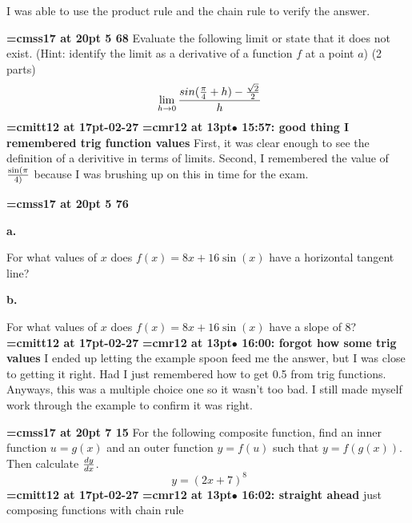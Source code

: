 I was able to use the product rule and the chain rule to verify the answer.
\par

{\medskip\noindent\bf\font\titlefont=cmss17 at 20pt 5 68}\medskip
Evaluate the following limit or state that it does not exist.
(Hint: identify the limit as a derivative of a function $f$
at a point $a$) (2 parts)
$$\
\lim_{h \to 0} {
{sin({\pi \over 4} + h}) - {\sqrt{2} \over 2}
\over
h
}
$$
{\medskip\noindent\bf\font\titlefont=cmitt12 at 17pt-02-27}\medskip
{\smallskip\noindent\bf\font\titlefont=cmr12 at 13pt\titlefont $\bullet$ 15:57: good thing I remembered trig function values}\smallskip
First, it was clear enough to see the definition of a derivitive in terms of limits. Second, I remembered the value of $\sin(\pi \over 4)$ because I was brushing up on this in time for the exam.
\par

{\medskip\noindent\bf\font\titlefont=cmss17 at 20pt 5 76}\medskip
{\par \bf a.} For what values of $x$ does
$f(x) = 8x + 16\sin(x)$ have a horizontal tangent line?
{\par \bf b.} For what values of $x$ does $f(x) = 8x + 16\sin(x)$
have a slope of 8?
{\medskip\noindent\bf\font\titlefont=cmitt12 at 17pt-02-27}\medskip
{\smallskip\noindent\bf\font\titlefont=cmr12 at 13pt\titlefont $\bullet$ 16:00: forgot how some trig values}\smallskip
I ended up letting the example spoon feed me the answer, but I was close to getting it right. Had I just remembered how to get 0.5 from trig functions. Anyways, this was a multiple choice one so it wasn't too bad. I still made myself work through the example to confirm it was right.
\par

{\medskip\noindent\bf\font\titlefont=cmss17 at 20pt 7 15}\medskip
For the following composite function, find an inner function
$u = g(x)$ and an outer function $y = f(u)$ such that
$y = f(g(x))$. Then calculate $dy \over dx$.
$$\
y = (2x + 7)^8
$$
{\medskip\noindent\bf\font\titlefont=cmitt12 at 17pt-02-27}\medskip
{\smallskip\noindent\bf\font\titlefont=cmr12 at 13pt\titlefont $\bullet$ 16:02: straight ahead}\smallskip
just composing functions with chain rule
\par

